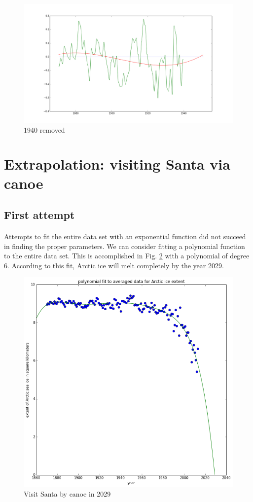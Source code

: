 \documentclass[12pt,a4paper]{article} %
\begin{document}
\begin{figure}[hp]
\centering
 \includegraphics[width=0.75\linewidth]{../img/1940_removed.png}
\caption{1940 removed}
\label{1940_removed}
\end{figure}




\section{Extrapolation: visiting Santa via canoe}
\subsection{First attempt}
\paragraph{}Attempts to fit the entire data set with an exponential function did not succeed in finding the proper parameters. We can consider fitting a polynomial function to the entire data set.  This is accomplished in Fig. \ref{genepoly}  with a polynomial of degree 6. According to this fit, Arctic ice will melt completely by the year 2029.

\begin{figure}[hp]
\centering
 \includegraphics[width=0.75\linewidth]{../img/polyFitAllData.png}
\caption{Visit Santa by canoe in 2029}
\label{genepoly}
\end{figure}
\end{document}
